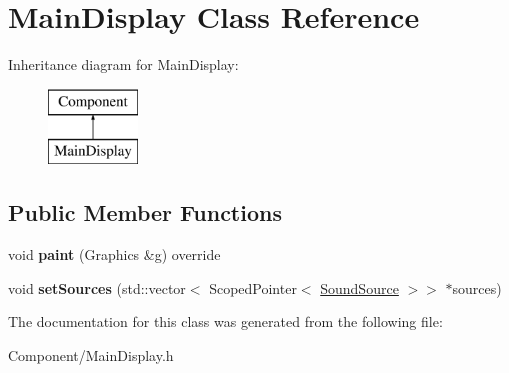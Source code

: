 \hypertarget{class_main_display}{}\section{Main\+Display Class Reference}
\label{class_main_display}
Inheritance diagram for Main\+Display\+:\begin{figure}[H]
\begin{center}
\leavevmode
\includegraphics[height=2.000000cm]{class_main_display}
\end{center}
\end{figure}
\subsection*{Public Member Functions}
\begin{DoxyCompactItemize}
\item 
\mbox{\label{class_main_display_a400f3f47e5251a4a0ba5396fb8c1bd7a}} 
void {\bfseries paint} (Graphics \&g) override
\item 
\mbox{\label{class_main_display_a66c6000e605709fe14f3395a9487900c}} 
void {\bfseries set\+Sources} (std\+::vector$<$ Scoped\+Pointer$<$ \hyperlink{class_sound_source}{Sound\+Source} $>$$>$ $\ast$sources)
\end{DoxyCompactItemize}


The documentation for this class was generated from the following file\+:\begin{DoxyCompactItemize}
\item 
Component/Main\+Display.\+h\end{DoxyCompactItemize}
